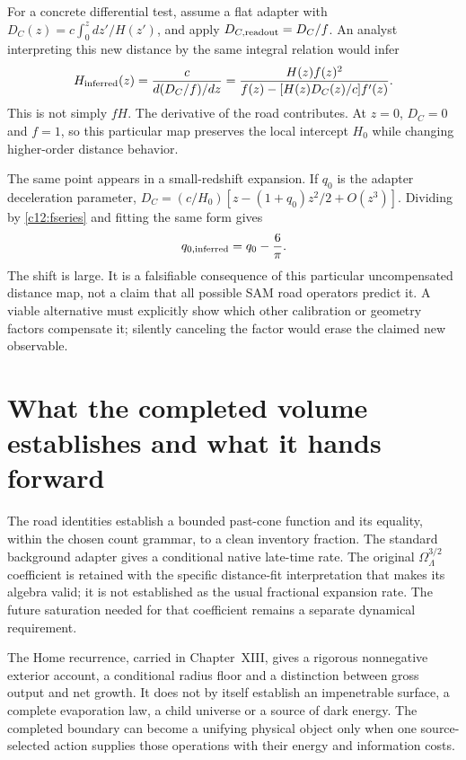 For a concrete differential test, assume a flat adapter with $D_C(z)=c\int_0^z dz'/H(z')$, and apply $D_{C,\rm readout}=D_C/f$. An analyst interpreting this new distance by the same integral relation would infer
\begin{equation}
 H_{\rm inferred}(z)
 =\frac{c}{d(D_C/f)/dz}
 =\frac{H(z)f(z)^2}
 {f(z)-[H(z)D_C(z)/c]f'(z)}.
 \label{c12:inferredH}
\end{equation}
This is not simply $fH$. The derivative of the road contributes. At $z=0$, $D_C=0$ and $f=1$, so this particular map preserves the local intercept $H_0$ while changing higher-order distance behavior.

The same point appears in a small-redshift expansion. If $q_0$ is the adapter deceleration parameter, $D_C=(c/H_0)[z-(1+q_0)z^2/2+O(z^3)]$. Dividing by \eqref{c12:fseries} and fitting the same form gives
\begin{equation}
 q_{0,\rm inferred}=q_0-\frac6\pi.
 \label{c12:qshift}
\end{equation}
The shift is large. It is a falsifiable consequence of this particular uncompensated distance map, not a claim that all possible SAM road operators predict it. A viable alternative must explicitly show which other calibration or geometry factors compensate it; silently canceling the factor would erase the claimed new observable.

\section{What the completed volume establishes and what it hands forward}
The road identities establish a bounded past-cone function and its equality, within the chosen count grammar, to a clean inventory fraction. The standard background adapter gives a conditional native late-time rate. The original $\Omega_\Lambda^{3/2}$ coefficient is retained with the specific distance-fit interpretation that makes its algebra valid; it is not established as the usual fractional expansion rate. The future saturation needed for that coefficient remains a separate dynamical requirement.

The Home recurrence, carried in Chapter~XIII, gives a rigorous nonnegative exterior account, a conditional radius floor and a distinction between gross output and net growth. It does not by itself establish an impenetrable surface, a complete evaporation law, a child universe or a source of dark energy. The completed boundary can become a unifying physical object only when one source-selected action supplies those operations with their energy and information costs.

